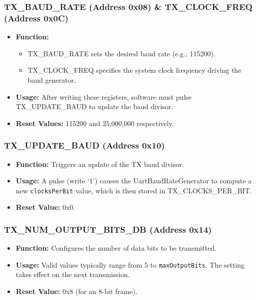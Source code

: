 \subsubsection{TX\_BAUD\_RATE (Address 0x08) \& TX\_CLOCK\_FREQ (Address 0x0C)}
\begin{itemize}[noitemsep]
    \item \textbf{Function:}
    \begin{itemize}
        \item TX\_BAUD\_RATE sets the desired baud rate (e.g., 115200).
        \item TX\_CLOCK\_FREQ specifies the system clock frequency driving the baud generator.
    \end{itemize}
    \item \textbf{Usage:} After writing these registers, software must pulse TX\_UPDATE\_BAUD to update the baud divisor.
    \item \textbf{Reset Values:} 115200 and 25,000,000 respectively.
\end{itemize}

\subsubsection{TX\_UPDATE\_BAUD (Address 0x10)}
\begin{itemize}[noitemsep]
    \item \textbf{Function:} Triggers an update of the TX baud divisor.
    \item \textbf{Usage:} A pulse (write ‘1’) causes the UartBaudRateGenerator to compute a new \texttt{clocksPerBit} value, which is then stored in TX\_CLOCKS\_PER\_BIT.
    \item \textbf{Reset Value:} 0x0.
\end{itemize}

\subsubsection{TX\_NUM\_OUTPUT\_BITS\_DB (Address 0x14)}
\begin{itemize}[noitemsep]
    \item \textbf{Function:} Configures the number of data bits to be transmitted.
    \item \textbf{Usage:} Valid values typically range from 5 to \texttt{maxOutputBits}. The setting takes effect on the next transmission.
    \item \textbf{Reset Value:} 0x8 (for an 8-bit frame).
\end{itemize}

